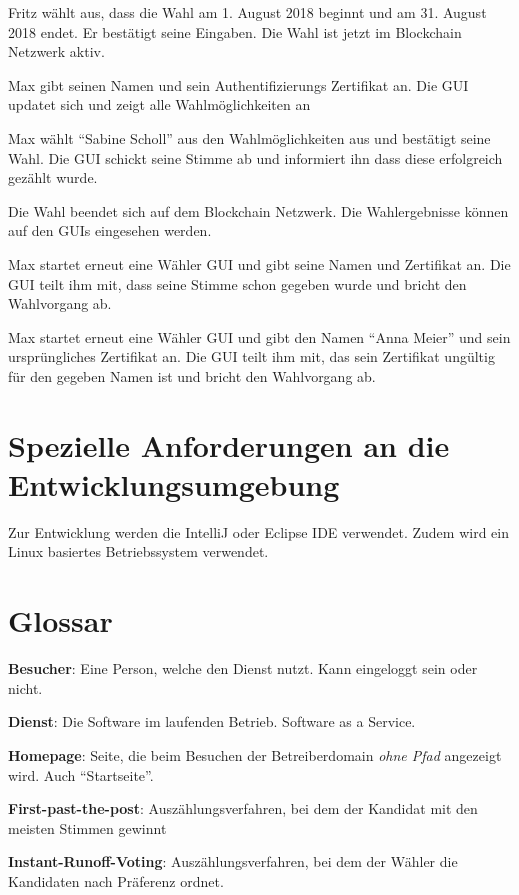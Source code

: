 \documentclass[parskip=full,11pt,twoside]{scrartcl}
\begin{document}
\teststep{}
		{Fritz wählt aus, dass die Wahl am 1. August 2018 beginnt und am 31. August 2018 endet. Er bestätigt seine Eingaben.}
		{Die Wahl ist jetzt im Blockchain Netzwerk aktiv.}

		{Max gibt seinen Namen und sein Authentifizierungs Zertifikat an.}
		{Die GUI updatet sich und zeigt alle Wahlmöglichkeiten an}
		
\teststep{}
		{Max wählt \enquote{Sabine Scholl} aus den Wahlmöglichkeiten aus und bestätigt seine Wahl.}
		{Die GUI schickt seine Stimme ab und informiert ihn dass diese erfolgreich gezählt wurde.}
		
		{Die Wahl beendet sich auf dem Blockchain Netzwerk.}
		{Die Wahlergebnisse können auf den GUIs eingesehen werden.}
		

		{Max startet erneut eine Wähler GUI und gibt seine Namen und Zertifikat an.}
		{Die GUI teilt ihm mit, dass seine Stimme schon gegeben wurde und bricht den Wahlvorgang ab.}

\teststep{}
		{Max startet erneut eine Wähler GUI und gibt den Namen \enquote{Anna Meier} und sein ursprüngliches Zertifikat an.}
		{Die GUI teilt ihm mit, das sein Zertifikat ungültig für den gegeben Namen ist und bricht den Wahlvorgang ab.}

\section{Spezielle Anforderungen an die Entwicklungsumgebung}
Zur Entwicklung werden die IntelliJ oder Eclipse IDE verwendet.
Zudem wird ein Linux basiertes Betriebssystem verwendet.

\section{Glossar}

\textbf{Besucher}:
Eine Person, welche den Dienst nutzt.
Kann eingeloggt sein oder nicht.

\textbf{Dienst}:
Die Software im laufenden Betrieb. Software as a Service.

\textbf{Homepage}:
Seite, die beim Besuchen der Betreiberdomain \emph{ohne Pfad} angezeigt wird. Auch \enquote{Startseite}.

\textbf{First-past-the-post}:
Auszählungsverfahren, bei dem der Kandidat mit den meisten Stimmen gewinnt

\textbf{Instant-Runoff-Voting}:
Auszählungsverfahren, bei dem der Wähler die Kandidaten nach Präferenz ordnet.
\end{document}
